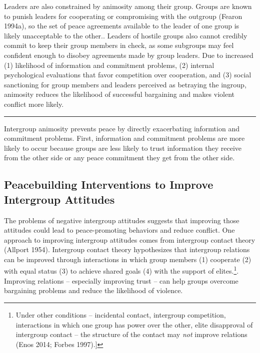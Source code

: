 \documentclass[11pt]{article}
\begin{document}
Leaders are also constrained by animosity among their group. Groups are
known to punish leaders for cooperating or compromising with the
outgroup (Fearon 1994a), so the set of peace agreements available to the
leader of one group is likely unacceptable to the other.. Leaders of
hostile groups also cannot credibly commit to keep their group members
in check, as some subgroups may feel confident enough to disobey
agreements made by group leaders. Due to increased (1) likelihood of
information and commitment problems, (2) internal psychological
evaluations that favor competition over cooperation, and (3) social
sanctioning for group members and leaders perceived as betraying the
ingroup, animosity reduces the likelihood of successful bargaining and
makes violent conflict more likely.

\begin{center}\rule{0.5\linewidth}{\linethickness}\end{center}

Intergroup animosity prevents peace by directly exacerbating informtion
and commitment problems. First, information and commitment problems are
more likely to occur because groups are less likely to trust information
they receive from the other side or any peace commitment they get from
the other side.

\hypertarget{peacebuilding-interventions-to-improve-intergroup-attitudes}{%
\subsection{Peacebuilding Interventions to Improve Intergroup
Attitudes}\label{peacebuilding-interventions-to-improve-intergroup-attitudes}}

The problems of negative intergroup attitudes suggests that improving
those attitudes could lead to peace-promoting behaviors and reduce
conflict. One approach to improving intergroup attitudes comes from
intergroup contact theory (Allport 1954). Intergroup contact theory
hypothesizes that intergroup relations can be improved through
interactions in which group members (1) cooperate (2) with equal status
(3) to achieve shared goals (4) with the support of elites.\footnote{Under
  other conditions -- incidental contact, intergroup competition,
  interactions in which one group has power over the other, elite
  disapproval of intergroup contact -- the structure of the contact may
  \emph{not} improve relations (Enos 2014; Forbes 1997).{]}}. Improving
relations -- especially improving trust -- can help groups overcome
bargaining problems and reduce the likelihood of violence.
\end{document}
